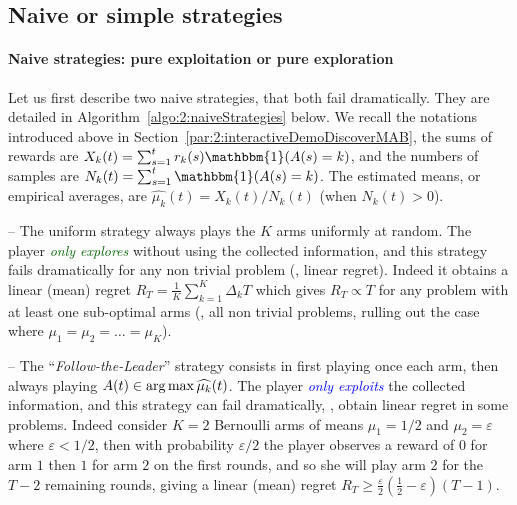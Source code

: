 \subsection{Naive or simple strategies}
\label{sub:2:naiveSimpleStrategies}


\paragraph{Naive strategies: pure exploitation or pure exploration}

Let us first describe two naive strategies, that both fail dramatically.
They are detailed in Algorithm~\ref{algo:2:naiveStrategies} below.
We recall the notations introduced above in Section~\ref{par:2:interactiveDemoDiscoverMAB}, the sums of rewards are $X_k(t) = \sum_{s=1}^t r_k(s) \mathbbm{1}(A(s) = k)$, and the numbers of samples are $N_k(t) = \sum_{s=1}^t \mathbbm{1}(A(s) = k)$.
%
The estimated means, or empirical averages, are $\widehat{\mu_k}(t) = X_k(t) / N_k(t)$ (when $N_k(t)>0$).

-- The uniform strategy always plays the $K$ arms uniformly at random.
The player \textcolor{darkgreen}{\emph{only explores}} without using the collected information, and this strategy fails dramatically for any non trivial problem (\ie, linear regret).
Indeed it obtains a linear (mean) regret $R_T = \frac{1}{K} \sum_{k=1}^K \Delta_k T$
which gives $R_T \propto T$ for any problem with at least one sub-optimal arms (\ie, all non trivial problems, rulling out the case where $\mu_1=\mu_2=\dots=\mu_K$).

-- The ``\emph{Follow-the-Leader}'' strategy consists in first playing once each arm, then always playing $A(t)\in\operatorname*{arg\,max} \widehat{\mu_k}(t)$.
The player \textcolor{blue}{\emph{only exploits}} the collected information, and this strategy can fail dramatically, \ie, obtain linear regret in some problems.
Indeed consider $K=2$ Bernoulli arms of means $\mu_1=1/2$ and $\mu_2=\varepsilon$ where $\varepsilon < 1/2$, then with probability $\varepsilon/2$ the player observes a reward of $0$ for arm $1$ then $1$ for arm $2$ on the first rounds, and so she will play arm $2$ for the $T-2$ remaining rounds, giving a linear (mean) regret $R_T \geq \frac{\varepsilon}{2}\left(\frac{1}{2} - \varepsilon\right) (T-1)$.

